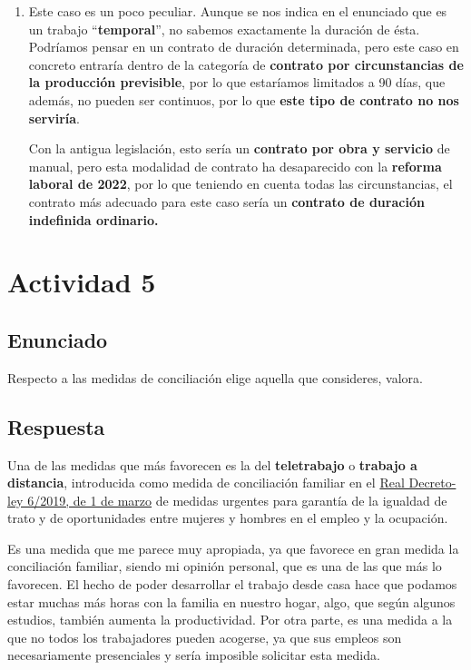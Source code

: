 \begin{enumerate}[label=(\alph*)]
    \item Este caso es un poco peculiar. Aunque se nos indica en el enunciado que es un trabajo ``\textbf{temporal}'', no sabemos exactamente la duración de ésta. Podríamos pensar en un contrato de duración determinada, pero este caso en concreto entraría dentro de la categoría de \textbf{contrato por circunstancias de la producción previsible}, por lo que estaríamos limitados a 90 días, que además, no pueden ser continuos, por lo que \textbf{este tipo de contrato no nos serviría}.

    Con la antigua legislación, esto sería un \textbf{contrato por obra y servicio} de manual, pero esta modalidad de contrato ha desaparecido con la \textbf{reforma laboral de 2022}, por lo que teniendo en cuenta todas las circunstancias, el contrato más adecuado para este caso sería un \textbf{contrato de duración indefinida ordinario.}
\end{enumerate}

\section{Actividad 5}
\subsection{Enunciado}
Respecto a las medidas de conciliación elige aquella que consideres, valora.


\subsection{Respuesta}
Una de las medidas que más favorecen es la del \textbf{teletrabajo} o \textbf{trabajo a distancia}, introducida como medida de conciliación familiar en el \href{https://www.boe.es/buscar/act.php?id=BOE-A-2019-3244&p=20190307&tn=1#a1}{Real Decreto-ley 6/2019, de 1 de marzo} de medidas urgentes para garantía de la igualdad de trato y de oportunidades entre mujeres y hombres en el empleo y la ocupación.

Es una medida que me parece muy apropiada, ya que favorece en gran medida la conciliación familiar, siendo mi opinión personal, que es una de las que más lo favorecen. El hecho de poder desarrollar el trabajo desde casa hace que podamos estar muchas más horas con la familia en nuestro hogar, algo, que según algunos estudios, también aumenta la productividad. Por otra parte, es una medida a la que no todos los trabajadores pueden acogerse, ya que sus empleos son necesariamente presenciales y sería imposible solicitar esta medida.

